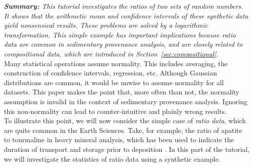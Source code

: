 \documentclass[11pt]{article}
\begin{document}
\textit{\textbf{Summary:} This tutorial investigates the ratios of two
  sets of random numbers. It shows that the arithmetic mean and
  confidence intervals of these synthetic data yield nonsensical
  results. These problems are solved by a logarithmic
  transformation. This simple example has important implications
  because ratio data are common in sedimentary provenance analysis,
  and are closely related to compositional data, which are introduced
  in Section~\ref{sec:compositional}.}\\

Many statistical operations assume normality. This includes averaging,
the construction of confidence intervals, regression, etc.  Although
Gaussian distributions are common, it would be unwise to assume
normality for all datasets. This paper makes the point that, more
often than not, the normality assumption is invalid in the context of
sedimentary provenance analysis. Ignoring this non-normality can lead
to counter-intuitive and plainly wrong results.\\

To illustrate this point, we will now consider the simple case of
\emph{ratio data}, which are quite common in the Earth Sciences. Take,
for example, the ratio of apatite to tourmaline in heavy mineral
analysis, which has been used to indicate the duration of transport
and storage prior to deposition \citep{morton1999}.  In this part of
the tutorial, we will investigate the statistics of ratio data using a
synthetic example.
\end{document}
